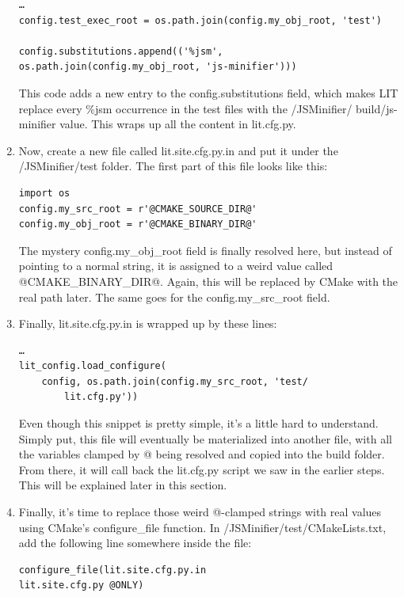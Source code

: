 \begin{enumerate}
\begin{lstlisting}[style=stylePython]
…
config.test_exec_root = os.path.join(config.my_obj_root, 'test')

config.substitutions.append(('%jsm',
os.path.join(config.my_obj_root, 'js-minifier')))
\end{lstlisting}

This code adds a new entry to the config.substitutions field, which makes LIT replace every \%jsm occurrence in the test files with the /JSMinifier/ build/js-minifier value. This wraps up all the content in lit.cfg.py.

\item Now, create a new file called lit.site.cfg.py.in and put it under the /JSMinifier/test folder. The first part of this file looks like this:

\begin{lstlisting}[style=stylePython]
import os
config.my_src_root = r'@CMAKE_SOURCE_DIR@'
config.my_obj_root = r'@CMAKE_BINARY_DIR@'
\end{lstlisting}

The mystery config.my\_obj\_root field is finally resolved here, but instead of pointing to a normal string, it is assigned to a weird value called @CMAKE\_BINARY\_DIR@. Again, this will be replaced by CMake with the real path later. The same goes for the config.my\_src\_root field.

\item Finally, lit.site.cfg.py.in is wrapped up by these lines:

\begin{lstlisting}[style=stylePython]
…
lit_config.load_configure(
	config, os.path.join(config.my_src_root, 'test/
		lit.cfg.py'))
\end{lstlisting}

Even though this snippet is pretty simple, it's a little hard to understand. Simply put, this file will eventually be materialized into another file, with all the variables clamped by @ being resolved and copied into the build folder. From there, it will call back the lit.cfg.py script we saw in the earlier steps. This will be explained later in this section.

\item Finally, it's time to replace those weird @-clamped strings with real values using CMake's configure\_file function. In /JSMinifier/test/CMakeLists.txt, add the following line somewhere inside the file:

\begin{lstlisting}[style=styleCMake]
configure_file(lit.site.cfg.py.in
lit.site.cfg.py @ONLY)
\end{lstlisting}


\end{enumerate}
